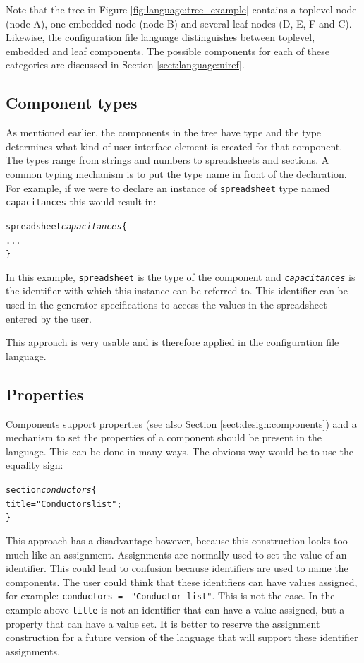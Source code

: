 \bigskip \noindent
Note that the tree in Figure \ref{fig:language:tree_example} contains a
toplevel node (node A), one embedded node (node B) and several leaf nodes (D,
E, F and C). Likewise, the configuration file language distinguishes between
toplevel, embedded and leaf components. The possible components for each of
these categories are discussed in Section \ref{sect:language:uiref}.


\subsection{Component types}
As mentioned earlier, the components in the tree have type and the type
determines what kind of user interface element is created for that component. The types range
from strings and numbers to spreadsheets and sections. A common typing
mechanism is to put the type name in front of the declaration. For example, if we
were to declare an instance of \verb=spreadsheet= type named
\verb=capacitances= this would result in:
\begin{alltt}
spreadsheet \emph{capacitances} \{
    ...
\}
\end{alltt}
In this example, \verb=spreadsheet= is the type of the component and
\texttt{\emph{capacitances}} is the identifier with which this instance can be
referred to. This identifier can be used in the generator specifications to
access the values in the spreadsheet entered by the user.

This approach is very usable and is therefore applied in the configuration file
language.

\subsection{Properties}
Components support properties (see also Section \ref{sect:design:components})
and a mechanism to set the properties of a component should be present in the
language. This can be done in many ways. The obvious way would be to use the
equality sign:
\begin{alltt}
section \emph{conductors} \{
    title = "Conductors list";
\}
\end{alltt}
This approach has a disadvantage however, because this construction looks too
much like an assignment. Assignments are normally used to set the value of an
identifier. This could lead to confusion because identifiers are used to name
the components. The user could think that these identifiers can have values
assigned, for example: \verb|conductors = | \verb|"Conductor list"|. This is
not the case. In the example above \verb=title= is not an identifier that can
have a value assigned, but a property that can have a value set. It is better
to reserve the assignment construction for a future version of the language
that will support these identifier assignments.

